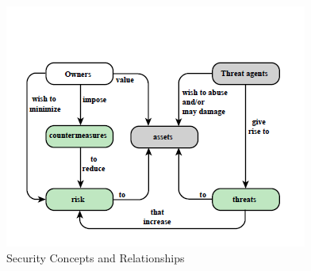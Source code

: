\documentclass{article}
\begin{document}
                    \begin{figure}[ht]
                        \begin{center}
                        \includegraphics{../immagini/security_Concepts.png}
                        \caption{Security Concepts and Relationships}
                        \end{center}
                    \end{figure}
            
\end{document}
